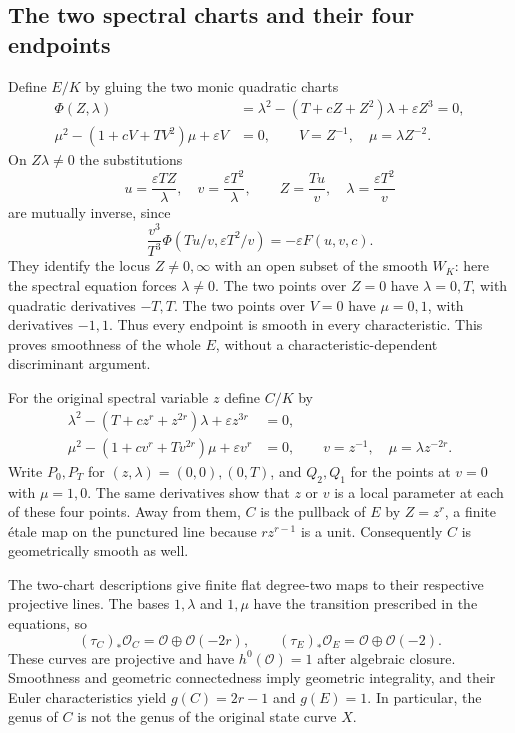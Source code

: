 \subsection{The two spectral charts and their four endpoints}

Define $E/K$ by gluing the two monic quadratic charts
\begin{equation}
\begin{aligned}
\Phi(Z,\lambda)&=\lambda^2-(T+cZ+Z^2)\lambda+\varepsilon Z^3=0,\\
\mu^2-(1+cV+TV^2)\mu+\varepsilon V&=0,
\qquad V=Z^{-1},\quad\mu=\lambda Z^{-2}.
\end{aligned}
\label{spec:quotient-charts}
\end{equation}
On $Z\lambda\ne0$ the substitutions
\begin{equation}
u=\frac{\varepsilon TZ}{\lambda},\quad
v=\frac{\varepsilon T^2}{\lambda},\qquad
Z=\frac{Tu}{v},\quad \lambda=\frac{\varepsilon T^2}{v}
\label{spec:birational-change}
\end{equation}
are mutually inverse, since
\[
\frac{v^3}{T^3}\Phi(Tu/v,\varepsilon T^2/v)=-\varepsilon F(u,v,c).
\]
They identify the locus $Z\ne0,\infty$ with an open subset of the
smooth $W_K$: here the spectral equation forces $\lambda\ne0$.
The two points over $Z=0$ have $\lambda=0,T$, with quadratic
derivatives $-T,T$.  The two points over $V=0$ have $\mu=0,1$,
with derivatives $-1,1$.  Thus every endpoint is smooth in every
characteristic.  This proves smoothness of the whole $E$, without
a characteristic-dependent discriminant argument.

For the original spectral variable $z$ define $C/K$ by
\begin{equation}
\begin{aligned}
\lambda^2-(T+cz^r+z^{2r})\lambda+\varepsilon z^{3r}&=0,\\
\mu^2-(1+cv^r+Tv^{2r})\mu+\varepsilon v^r&=0,
\qquad v=z^{-1},\quad\mu=\lambda z^{-2r}.
\end{aligned}
\label{spec:original-charts}
\end{equation}
Write $P_0,P_T$ for $(z,\lambda)=(0,0),(0,T)$, and $Q_2,Q_1$ for
the points at $v=0$ with $\mu=1,0$.  The same derivatives show that
$z$ or $v$ is a local parameter at each of these four points.
Away from them, $C$ is the pullback of $E$ by $Z=z^r$, a finite
\'{e}tale map on the punctured line because $rz^{r-1}$ is a unit.
Consequently $C$ is geometrically smooth as well.

The two-chart descriptions give finite flat degree-two maps to their
respective projective lines.  The bases $1,\lambda$ and $1,\mu$
have the transition prescribed in the equations, so
\begin{equation}
(\tau_C)_*\mathcal O_C=\mathcal O\oplus\mathcal O(-2r),
\qquad
(\tau_E)_*\mathcal O_E=\mathcal O\oplus\mathcal O(-2).
\label{spec:finite-pushdown}
\end{equation}
These curves are projective and have $h^0(\mathcal O)=1$ after
algebraic closure.  Smoothness and geometric connectedness imply
geometric integrality, and their Euler characteristics yield
$g(C)=2r-1$ and $g(E)=1$.  In particular, the genus of $C$ is not
the genus of the original state curve $X$.

